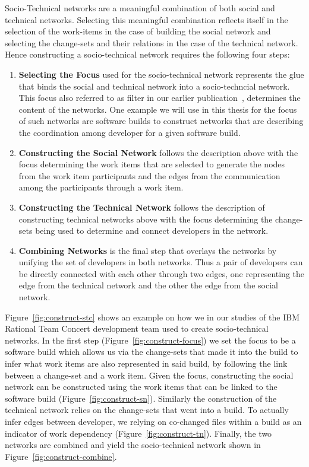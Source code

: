 Socio-Technical networks are a meaningful combination of both social and technical networks.
Selecting this meaningful combination reflects itself in the selection of the work-items in the case of building the social network and selecting the change-sets and their relations in the case of the technical network.
Hence constructing a socio-technical network requires the following four steps:

\begin{enumerate}
\item\textbf{Selecting the Focus} used for the socio-technical network represents the glue that binds the social and technical network into a socio-techncial network. 
This focus also referred to as filter in our earlier publication~\cite{wolf:ieee:2009}, determines the content of the networks.
One example we will use in this thesis for the focus of such networks are software builds to construct networks that are describing the coordination among developer for a given software build.
\item\textbf{Constructing the Social Network} follows the description above with the focus determining the work items that are selected to generate the nodes from the work item participants and the edges from the communication among the participants through a work item.
\item\textbf{Constructing the Technical Network} follows the description of constructing technical networks above with the focus determining the change-sets being used to determine and connect developers in the network.
\item\textbf{Combining Networks} is the final step that overlays the networks by unifying the set of developers in both networks.
Thus a pair of developers can be directly connected with each other through two edges, one representing the edge from the technical network and the other the edge from the social network.
\end{enumerate}

Figure~\ref{fig:construct-stc} shows an example on how we in our studies of the IBM Rational Team Concert development team used to create socio-technical networks.
In the first step (Figure~\ref{fig:construct-focus}) we set the focus to be a software build which allows us via the change-sets that made it into the build to infer what work items are also represented in said build, by following the link between a change-set and a work item.
Given the focus, constructing the social network can be constructed using the work items that can be linked to the software build (Figure~\ref{fig:construct-sn}).
Similarly the construction of the technical network relies on the change-sets that went into a build. 
To actually infer edges between developer, we relying on co-changed files within a build as an indicator of work dependency (Figure~\ref{fig:construct-tn}).
Finally, the two networks are combined and yield the socio-technical network shown in Figure~\ref{fig:construct-combine}.

